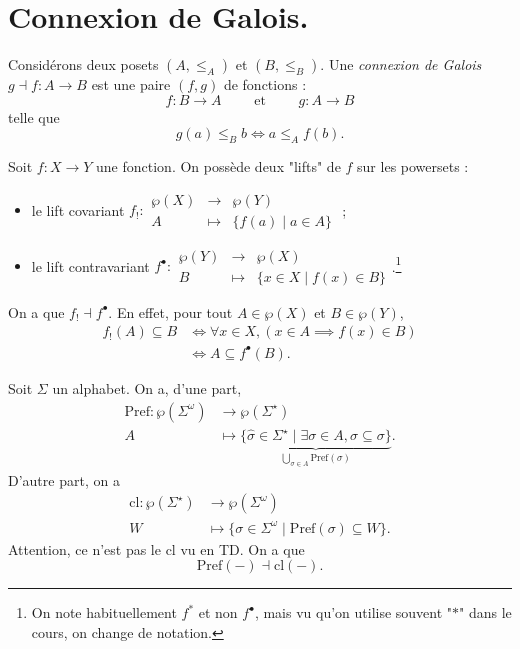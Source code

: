 \documentclass[./main]{subfiles}
\begin{document}
  \section{Connexion de Galois.}

  \begin{defn}
    Considérons deux posets $(A, \le_A)$ et $(B, \le_B)$.
    Une \textit{connexion de Galois} $g \dashv f : A \to B$ est une paire $(f, g)$ de fonctions :
    \[
    f : B \to A \quad\quad \text{ et }\quad\quad g : A \to B
    \] 
    telle que \[
    g(a) \le_B b \iff a \le_A f(b)
    .\] 
  \end{defn}

  \begin{exm}
    Soit $f : X \to Y$ une fonction.
    On possède deux "lifts" de $f$ sur les powersets :
    \begin{itemize}
      \item le lift covariant $
        f_! : \begin{array}{rcl}
          \wp(X) & \longrightarrow & \wp(Y)\\
          A & \longmapsto & \{f(a)  \mid a \in A\}
        \end{array}$ ;
      \item le lift contravariant $
        f^\bullet : \begin{array}{rcl}
          \wp(Y) & \longrightarrow & \wp(X)\\
          B & \longmapsto & \{x \in X  \mid f(x) \in B\}
        \end{array}$.\footnote{On note habituellement $f^*$ et non $f^\bullet$, mais vu qu'on utilise souvent "$*$" dans le cours, on change de notation.}
    \end{itemize}

    On a que $f_! \dashv f^\bullet$.
    En effet, pour tout  $A \in \wp(X)$ et $B \in \wp(Y)$,
    \begin{align*}
      f_!(A) \subseteq B &\iff \forall x \in X, (x \in A \implies f(x) \in B)\\
                         &\iff A \subseteq f^\bullet(B)
    .\end{align*}
  \end{exm}

  \begin{exm}
    Soit $\Sigma$ un alphabet.
    On a, d'une part,
    \begin{align*}
      \mathrm{Pref}: \wp(\Sigma^\omega) &\longrightarrow \wp(\Sigma^\star) \\
      A &\longmapsto \underbrace{\{\hat{\sigma} \in \Sigma^\star  \mid \exists \sigma \in A, \hat{\sigma} \subseteq \sigma\}} _{\bigcup_{\sigma \in A} \mathrm{Pref}(\sigma) }
    .\end{align*}
    D'autre part, on a 
    \begin{align*}
      \mathrm{cl}: \wp(\Sigma^\star) &\longrightarrow \wp(\Sigma^\omega) \\
      W &\longmapsto \{\sigma \in \Sigma^\omega  \mid \mathrm{Pref}(\sigma) \subseteq W\} 
    .\end{align*}
    Attention, ce n'est pas le $\mathrm{cl}$ vu en TD.
    On a que
    \[
    \mathrm{Pref}(-) \dashv \mathrm{cl}(-)
    .\] 
  \end{exm}
\end{document}
